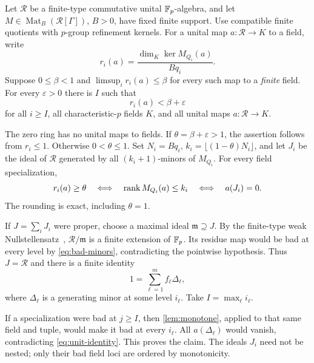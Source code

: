 \begin{theorem}\label{thm:uniformization}
\notformalized
Let $\mathscr R$ be a finite-type commutative unital $\mathbb{F}_p$-algebra,
and let $M\in\operatorname{Mat}_B(\mathscr R[\Gamma])$, $B>0$, have
fixed finite support. Use compatible finite quotients with $p$-group
refinement kernels. For a unital map $a:\mathscr R\to K$ to a field,
write
\[
 r_i(a)=\frac{\dim_K\ker M_{Q_i}(a)}{Bq_i}.
\]
Suppose $0\le\beta<1$ and $\limsup_i r_i(a)\le\beta$ for every
such map to a \emph{finite} field. For every $\varepsilon>0$ there
is $I$ such that
\[
 r_i(a)<\beta+\varepsilon
\]
for all $i\ge I$, all characteristic-$p$ fields $K$, and all unital
maps $a:\mathscr R\to K$.
\end{theorem}
\begin{informalproof}
The zero ring has no unital maps to fields. If
$\theta=\beta+\varepsilon>1$, the assertion follows from $r_i\le1$.
Otherwise $0<\theta\le1$. Set $N_i=Bq_i$,
$k_i=\lfloor(1-\theta)N_i\rfloor$, and let $J_i$ be the ideal of
$\mathscr R$ generated by all $(k_i+1)$-minors of $M_{Q_i}$.
For every field specialization,
\begin{equation}\label{eq:bad-minors}
 r_i(a)\ge\theta\quad\Longleftrightarrow\quad
 \operatorname{rank} M_{Q_i}(a)\le k_i
 \quad\Longleftrightarrow\quad a(J_i)=0.
\end{equation}
The rounding is exact, including $\theta=1$.

If $J=\sum_iJ_i$ were proper, choose a maximal ideal
$\mathfrak m\supseteq J$. By the finite-type weak
Nullstellensatz~\cite[Theorem~10.34.1]{Stacks00FV},
$\mathscr R/\mathfrak m$ is a finite extension of $\mathbb{F}_p$.
Its residue map would be bad at every level by \eqref{eq:bad-minors},
contradicting the pointwise hypothesis. Thus $J=\mathscr R$ and
there is a finite identity
\begin{equation}\label{eq:unit-identity}
 1=\sum_{\ell=1}^m f_\ell\Delta_\ell,
\end{equation}
where $\Delta_\ell$ is a generating minor at some level $i_\ell$.
Take $I=\max_\ell i_\ell$.

If a specialization were bad at $j\ge I$, then
\cref{lem:monotone}, applied to that same field and tuple, would
make it bad at every $i_\ell$. All $a(\Delta_\ell)$ would vanish,
contradicting \eqref{eq:unit-identity}. This proves the claim.
The ideals $J_i$ need not be nested; only their bad field loci are
ordered by monotonicity.
\end{informalproof}

